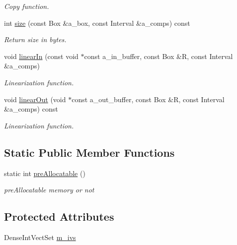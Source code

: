 \begin{DoxyCompactItemize}
\begin{DoxyCompactList}\small\item\em Copy function. \end{DoxyCompactList}\item 
int \hyperlink{classtags_a98c24b24e837fa4175e4a74c5d1b73e9}{size} (const Box \&a\+\_\+box, const Interval \&a\+\_\+comps) const 
\begin{DoxyCompactList}\small\item\em Return size in bytes. \end{DoxyCompactList}\item 
void \hyperlink{classtags_a8fcae89bd0c1818fd4a8e410c4610162}{linear\+In} (const void $\ast$const a\+\_\+in\+\_\+buffer, const Box \&R, const Interval \&a\+\_\+comps)
\begin{DoxyCompactList}\small\item\em Linearization function. \end{DoxyCompactList}\item 
void \hyperlink{classtags_a5d4649f91787b915e41a2f275e90dbe1}{linear\+Out} (void $\ast$const a\+\_\+out\+\_\+buffer, const Box \&R, const Interval \&a\+\_\+comps) const 
\begin{DoxyCompactList}\small\item\em Linearization function. \end{DoxyCompactList}\end{DoxyCompactItemize}
\subsection*{Static Public Member Functions}
\begin{DoxyCompactItemize}
\item 
static int \hyperlink{classtags_a9842e4d3ac8966027a87959815252392}{pre\+Allocatable} ()
\begin{DoxyCompactList}\small\item\em pre\+Allocatable memory or not \end{DoxyCompactList}\end{DoxyCompactItemize}
\subsection*{Protected Attributes}
\begin{DoxyCompactItemize}
\item 
Dense\+Int\+Vect\+Set \hyperlink{classtags_a0ebb666b1ee378c0b162b31f3486a7c9}{m\+\_\+ivs}
\end{DoxyCompactItemize}


